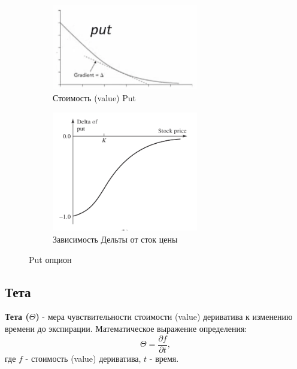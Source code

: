 \documentclass{article}
\begin{document}
  \begin{figure}[h]
	\centering
	\begin{subfigure}{.5\textwidth}
		\centering
		\includegraphics[width=0.7\textwidth]{value-put.jpg}
		\caption{Стоимость (value) Put}
		\label{model}
	\end{subfigure}
	\begin{subfigure}{.47\textwidth}
		\centering
		\includegraphics[width=0.7\textwidth]{delta-put.jpeg}
		\caption{Зависимость Дельты от сток цены}
		\label{model}
	\end{subfigure}
	
	\caption{Put опцион}
	\label{model}
\end{figure}
 

 
\subsection{Тета}

 \textbf{Тета ($\Theta$)} - мера чувствительности стоимости (value) дериватива к изменению времени до экспирации. Математическое выражение определения:
 $$\Theta = \dfrac{\partial f}{\partial t},$$ где $f$ - стоимость (value) дериватива, $t$ - время. 
 
\end{document}
